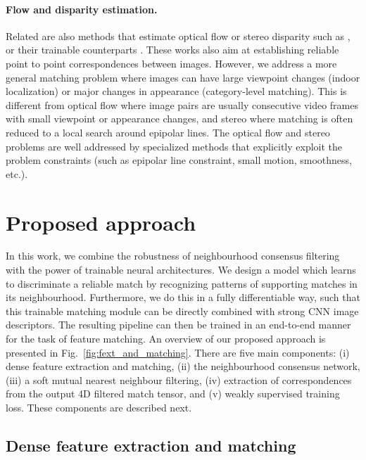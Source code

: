 \documentclass{article}
\begin{document}
\paragraph{Flow and disparity estimation.}
Related are also methods that estimate optical flow or stereo disparity such as \cite{lucas1981iterative,horn1981determining,Hirschmuller08,sun2010secrets,brox2011large}, or their trainable counterparts \cite{flownet,pwc,gcnet}. These works also aim at establishing reliable point to point correspondences between images. However, we address a more general matching problem where images can have large viewpoint changes (indoor localization) or major changes in appearance (category-level matching). This is different from optical flow where image pairs are usually consecutive video frames with small viewpoint or appearance changes, and stereo where matching is often reduced to a local search around epipolar lines. The optical flow and stereo problems are well addressed by specialized methods that explicitly exploit the problem constraints (such as epipolar line constraint, small motion, smoothness, etc.). 

\section{Proposed approach}

In this work, we combine the robustness of neighbourhood consensus filtering with the power of trainable neural architectures. We design a model which learns to discriminate a reliable match by recognizing patterns of supporting matches in its neighbourhood. Furthermore, we do this in a fully differentiable way, such that this trainable matching 
module can be directly combined with strong CNN image descriptors. The resulting pipeline can then be trained in an end-to-end manner for the task of feature matching. An overview of our proposed approach is presented in Fig.~\ref{fig:fext_and_matching}. There are five main components: (i) dense feature extraction and matching, (ii) the neighbourhood consensus network, (iii) a soft mutual nearest neighbour filtering, (iv) extraction of correspondences from the output 4D filtered match tensor, and (v) weakly supervised training loss. These components are described next.

\subsection{Dense feature extraction and matching}
\end{document}
